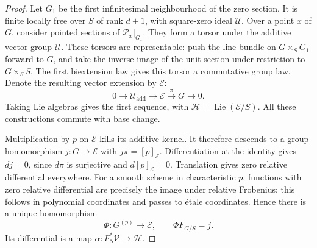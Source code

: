 \begin{proof}
Let $G_1$ be the first infinitesimal neighbourhood of the zero
section. It is finite locally free over $S$ of rank $d+1$, with
square-zero ideal $\mathcal U$.
Over a point $x$ of $G$, consider pointed sections of
$\mathcal P_x|_{G_1}$. They form a torsor under the additive vector
group $\mathcal U$.
These torsors are representable: push the line bundle on
$G\times_S G_1$ forward to $G$, and take the inverse image of the
unit section under restriction to $G\times_S S$.
The first biextension law gives this torsor a commutative group
law. Denote the resulting vector extension by $\mathcal E$:
\[
        0\longrightarrow\mathcal U_{\mathrm{add}}
          \longrightarrow\mathcal E\xrightarrow{\pi}G
          \longrightarrow0.
\]
Taking Lie algebras gives the first sequence, with
$\mathcal H=\operatorname{Lie}(\mathcal E/S)$.
All these constructions commute with base change.

Multiplication by $p$ on $\mathcal E$ kills its additive kernel.
It therefore descends to a group homomorphism $j:G\to\mathcal E$
with $j\pi=[p]_{\mathcal E}$.
Differentiation at the identity gives $dj=0$, since $d\pi$ is
surjective and $d[p]_{\mathcal E}=0$. Translation gives zero
relative differential everywhere.
For a smooth scheme in characteristic $p$, functions with zero
relative differential are precisely the image under relative
Frobenius; this follows in polynomial coordinates and passes to
\'etale coordinates. Hence there is a unique homomorphism
\[
       \Phi:G^{(p)}\longrightarrow\mathcal E,\qquad
       \Phi F_{G/S}=j.
\]
Its differential is a map
$\alpha:F_S^*\mathcal V\to\mathcal H$.


\end{proof}
